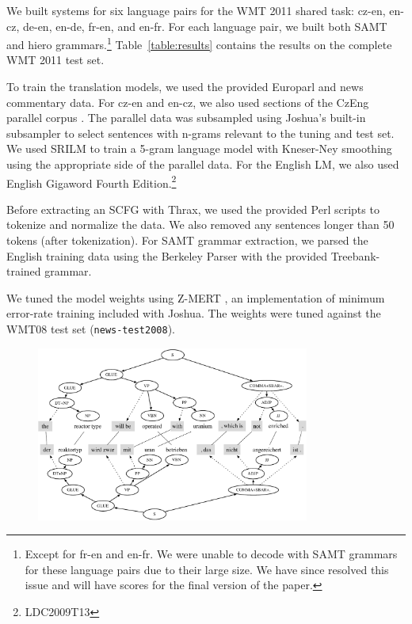 \documentclass[11pt]{article}
\begin{document}
We built systems for six language pairs for the WMT 2011 shared task:
cz-en, en-cz, de-en, en-de, fr-en, and en-fr.  For each language pair,
we built both SAMT and hiero grammars.\footnote{Except for fr-en and
  en-fr.  We were unable to decode with SAMT grammars for these
  language pairs due to their large size.  We have since resolved this
  issue and will have scores for the final version of the paper.}
Table~\ref{table:results} contains the results on the complete WMT
2011 test set.

To train the translation models, we used the provided Europarl and
news commentary data. For cz-en and en-cz, we also used sections of
the CzEng parallel corpus \cite{czeng:pbml:2009}.  The parallel data
was subsampled using Joshua's built-in subsampler to select sentences
with n-grams relevant to the tuning and test set.  We used SRILM to train a 5-gram language model with Kneser-Ney smoothing using the appropriate side of the parallel data. For the English LM, we also used English Gigaword Fourth Edition.\footnote{LDC2009T13}

Before extracting an SCFG with Thrax, we used the provided Perl
scripts to tokenize and normalize the data. We also removed any
sentences longer than 50 tokens (after tokenization).  For SAMT
grammar extraction, 
we parsed the English training data using the Berkeley Parser
\cite{petrov2006learning} with the
provided Treebank-trained grammar.

We tuned the model weights using Z-MERT \cite{zaidan2009z}, an
implementation of minimum error-rate training included with Joshua.  The weights were tuned against the WMT08 test set ({\tt news-test2008}).

\begin{figure}[t]
  \centering
  \includegraphics[width=0.8\textwidth]{figures/derivation}
  \caption{}
  \label{figure:derivation}
\end{figure}
\end{document}
